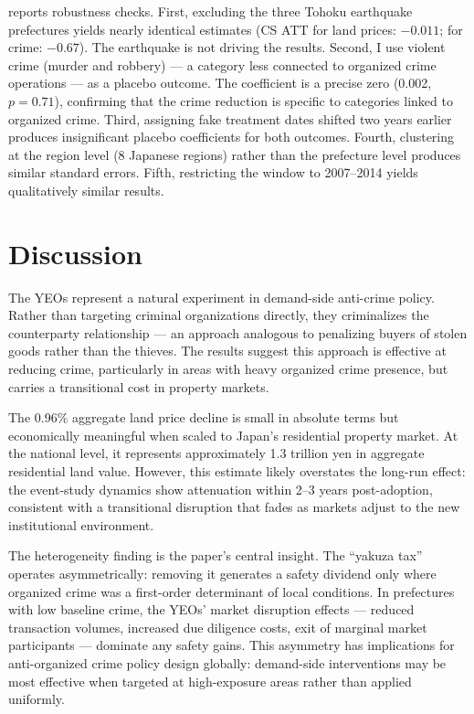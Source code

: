 \documentclass[12pt]{article}
\begin{document}
 reports robustness checks. First, excluding the three Tohoku earthquake prefectures yields nearly identical estimates (CS ATT for land prices: $-0.011$; for crime: $-0.67$). The earthquake is not driving the results. Second, I use violent crime (murder and robbery) --- a category less connected to organized crime operations --- as a placebo outcome. The coefficient is a precise zero (0.002, $p = 0.71$), confirming that the crime reduction is specific to categories linked to organized crime. Third, assigning fake treatment dates shifted two years earlier produces insignificant placebo coefficients for both outcomes. Fourth, clustering at the region level (8 Japanese regions) rather than the prefecture level produces similar standard errors. Fifth, restricting the window to 2007--2014 yields qualitatively similar results.

\section{Discussion}

The YEOs represent a natural experiment in demand-side anti-crime policy. Rather than targeting criminal organizations directly, they criminalizes the counterparty relationship --- an approach analogous to penalizing buyers of stolen goods rather than the thieves. The results suggest this approach is effective at reducing crime, particularly in areas with heavy organized crime presence, but carries a transitional cost in property markets.

The 0.96\% aggregate land price decline is small in absolute terms but economically meaningful when scaled to Japan's residential property market. At the national level, it represents approximately 1.3 trillion yen in aggregate residential land value. However, this estimate likely overstates the long-run effect: the event-study dynamics show attenuation within 2--3 years post-adoption, consistent with a transitional disruption that fades as markets adjust to the new institutional environment.

The heterogeneity finding is the paper's central insight. The ``yakuza tax'' operates asymmetrically: removing it generates a safety dividend only where organized crime was a first-order determinant of local conditions. In prefectures with low baseline crime, the YEOs' market disruption effects --- reduced transaction volumes, increased due diligence costs, exit of marginal market participants --- dominate any safety gains. This asymmetry has implications for anti-organized crime policy design globally: demand-side interventions may be most effective when targeted at high-exposure areas rather than applied uniformly.
\end{document}
